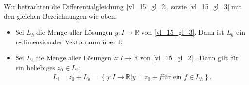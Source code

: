 \begin{Satz}{
	Wir betrachten die Differentialgleichung~\ref{vl_15_gl_2}, sowie \ref{vl_15_gl_3} mit den gleichen Bezeichnungen wie oben. 
	\begin{itemize}
		\item Sei $L_h$ die Menge aller Lösungen $y: I \rightarrow \mathbb{R}$ 
		von \ref{vl_15_gl_3}. Dann ist $L_h$ ein n-dimensionaler Vektorraum über 
		$\mathbb{R}$
		\item Sei $L_i$ die Menge aller Lösungen $z: I \rightarrow \mathbb{R}$ 
		von \ref{vl_15_gl_2} . 
		Dann gilt für ein beliebiges $z_0 \in L_i$:
		\begin{align*}
		L_i = z_0 + L_h
		= \left\{ y : I \rightarrow \mathbb{R} \vert y = z_0 + f 
		\text{für ein } f \in L_h\right\}.
	\end{align*}			
	\end{itemize}
}\end{Satz}
